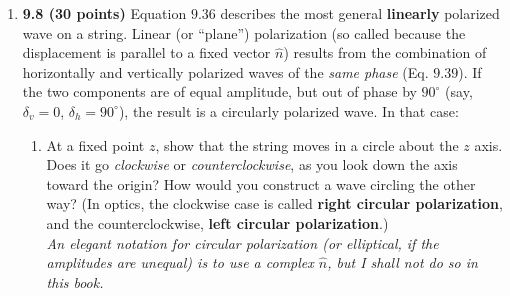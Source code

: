 \documentclass[fleqn]{article}
\begin{document}
  \begin{enumerate}
    \item \textbf{9.8 (30 points)} Equation $9.36$ describes the most general \textbf{linearly} polarized wave on a string. 
    Linear (or “plane”) polarization (so called because the displacement is parallel to a fixed vector $\hat{n}$) results
    from the combination of horizontally and vertically polarized waves of the \emph{same phase} (Eq. $9.39$). If the two 
    components are of equal amplitude, but out of phase by $90^{\circ}$ (say, $\delta_v=0$, $\delta_h=90^{\circ}$), the result is a circularly
    polarized wave. In that case:
    \begin{enumerate}
      \item At a fixed point $z$, show that the string moves in a circle about the $z$ axis. Does it go \emph{clockwise} or 
      \emph{counterclockwise}, as you look down the axis toward the origin? How would you construct a wave circling the 
      other way? (In optics, the clockwise case is called \textbf{right circular polarization}, and the counterclockwise, \textbf{left
      circular polarization}.)
      \\
      \emph{An elegant notation for circular polarization (or elliptical, if the amplitudes are unequal) is to use a
      complex $\hat{n}$, but I shall not do so in this book.}


\end{enumerate}
\end{enumerate}
\end{document}
